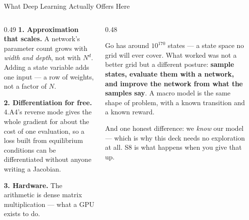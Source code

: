 \begin{frame}{What Deep Learning Actually Offers Here}
\begin{columns}[T]
\begin{column}{0.49\textwidth}
\small
\textbf{1. Approximation that scales.} A network's parameter count grows with \emph{width and depth}, not with $N^{d}$. Adding a state variable adds one input --- a row of weights, not a factor of $N$.
\medskip

\textbf{2. Differentiation for free.} 4.A4's reverse mode gives the whole gradient for about the cost of one evaluation, so a loss built from equilibrium conditions can be differentiated without anyone writing a Jacobian.
\medskip

\textbf{3. Hardware.} The arithmetic is dense matrix multiplication --- what a GPU exists to do.
\end{column}
\begin{column}{0.48\textwidth}
\begin{conceptbox}[title=\textbf{The AlphaGo reframing}]\small
Go has around $10^{170}$ states --- a state space no grid will ever cover. What worked was not a better grid but a different posture: \textbf{sample states, evaluate them with a network, and improve the network from what the samples say}.
\medskip
A macro model is the same shape of problem, with a known transition and a known reward.
\end{conceptbox}
\smallskip
{\footnotesize And one honest difference: we \emph{know} our model --- which is why this deck needs no exploration at all. S8 is what happens when you give that up.}
\end{column}
\end{columns}
\end{frame}


